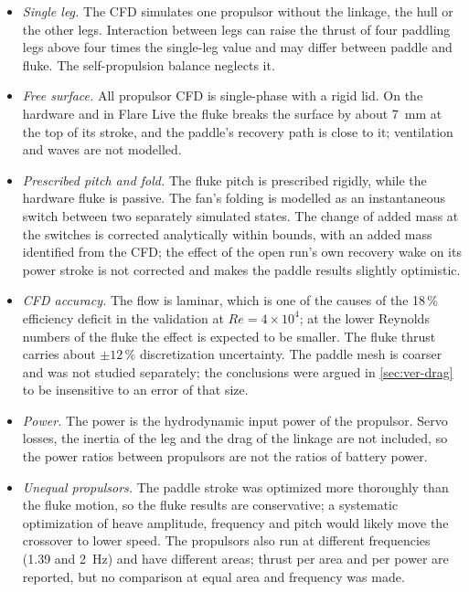 \begin{itemize}
  \item \emph{Single leg.} The CFD simulates one propulsor without the linkage, the hull or the other legs. Interaction between
        legs can raise the thrust of four paddling legs above four times the single-leg value \cite{Wang2025} and may differ between
        paddle and fluke. The self-propulsion balance neglects it.
  \item \emph{Free surface.} All propulsor CFD is single-phase with a rigid lid. On the hardware and in Flare Live the fluke breaks the
        surface by about \SI{7}{\milli\metre} at the top of its stroke, and the paddle's recovery path is close to it; ventilation
        and waves are not modelled.
  \item \emph{Prescribed pitch and fold.} The fluke pitch is prescribed rigidly, while the hardware fluke is passive. The fan's
        folding is modelled as an instantaneous switch between two separately simulated states. The change of added mass at the
        switches is corrected analytically within bounds, with an added mass identified from the CFD; the effect of the open run's
        own recovery wake on its power stroke is not corrected and makes the paddle results slightly optimistic.
  \item \emph{CFD accuracy.} The flow is laminar, which is one of the causes of the 18\,\% efficiency deficit in the validation at
        $\mathit{Re}=4\times10^4$; at the lower Reynolds numbers of the fluke the effect is expected to be smaller. The fluke thrust carries
        about $\pm12$\,\% discretization uncertainty. The paddle mesh is coarser and was not studied separately; the conclusions were argued in \cref{sec:ver-drag} to be insensitive to an error of that size.
  \item \emph{Power.} The power is the hydrodynamic input power of the propulsor. Servo losses, the inertia of the leg and the drag of
        the linkage are not included, so the power ratios between propulsors are not the ratios of battery power.
  \item \emph{Unequal propulsors.} The paddle stroke was optimized more thoroughly than the fluke motion, so the fluke results are
        conservative; a systematic optimization of heave amplitude, frequency and pitch would likely move the crossover to lower speed.
        The propulsors also run at different frequencies (\SI{1.39}{} and \SI{2}{\hertz}) and have different areas; thrust per area and
        per power are reported, but no comparison at equal area and frequency was made.

\end{itemize}
